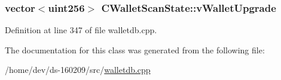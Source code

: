 \hypertarget{class_c_wallet_scan_state_a6cbf626ca5a0275f0469684f22dff12f}{}
\subsubsection[{v\+Wallet\+Upgrade}]{\setlength{\rightskip}{0pt plus 5cm}vector$<${\bf uint256}$>$ C\+Wallet\+Scan\+State\+::v\+Wallet\+Upgrade}\label{class_c_wallet_scan_state_a6cbf626ca5a0275f0469684f22dff12f}


Definition at line 347 of file walletdb.\+cpp.



The documentation for this class was generated from the following file\+:\begin{DoxyCompactItemize}
\item 
/home/dev/ds-\/160209/src/\hyperlink{walletdb_8cpp}{walletdb.\+cpp}\end{DoxyCompactItemize}
